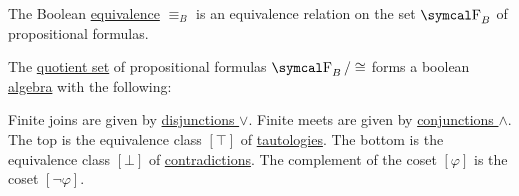 \begin{proposition}\label{thm:boolean_equivalence_relation}
  The Boolean \hyperref[def:propositional_interpretation]{equivalence} \( \equiv_B \) is an equivalence relation on the set \( \CF_B \) of propositional formulas.
\end{proposition}

\begin{theorem}\label{thm:propositional_logic_boolean_algebra}
  The \hyperref[def:equivalence_relation]{quotient set} of propositional formulas \( \CF_B / \cong \) forms a boolean \hyperref[def:boolean_algebra]{algebra} with the following:
  \begin{RefList}
     Finite joins are given by \hyperref[def:propositional_language/connectives/disjunction]{disjunctions \( \vee \)}.
     Finite meets are given by \hyperref[def:propositional_language/connectives/conjunction]{conjunctions \( \wedge \)}.
     The top is the equivalence class \( [\top] \) of \hyperref[def:propositional_interpretation/tautology]{tautologies}.
     The bottom is the equivalence class \( [\bot] \) of \hyperref[def:propositional_interpretation/contradiction]{contradictions}.
     The complement of the coset \( [\varphi] \) is the coset \hyperref[def:propositional_language/negation]{\( [\neg \varphi] \)}.
  \end{RefList}
\end{theorem}
